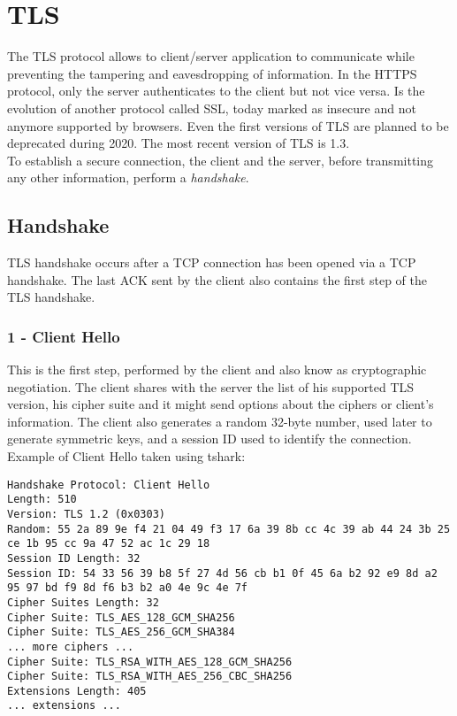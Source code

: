 \section{TLS}
The TLS protocol allows to client/server application to communicate while preventing the tampering and eavesdropping of information. In the HTTPS protocol, only the server authenticates to the client but not vice versa. Is the evolution of another protocol called SSL, today marked as insecure and not anymore supported by browsers. Even the first versions of TLS are planned to be deprecated during 2020. The most recent version of TLS is 1.3.\\
To establish a secure connection, the client and the server, before transmitting any other information, perform a \emph{handshake}.
\subsection{Handshake}
TLS handshake occurs after a TCP connection has been opened via a TCP handshake. The last ACK sent by the client also contains the first step of the TLS handshake.
\subsubsection{1 - Client Hello}
This is the first step, performed by the client and also know as cryptographic negotiation. The client shares with the server the list of his supported TLS version, his cipher suite and it might send options about the ciphers or client's information. The client also generates a random 32-byte number, used later to generate symmetric keys, and a session ID used to identify the connection.\\
Example of Client Hello taken using tshark:
\begin{lstlisting}
Handshake Protocol: Client Hello
Length: 510
Version: TLS 1.2 (0x0303)
Random: 55 2a 89 9e f4 21 04 49 f3 17 6a 39 8b cc 4c 39 ab 44 24 3b 25 ce 1b 95 cc 9a 47 52 ac 1c 29 18
Session ID Length: 32
Session ID: 54 33 56 39 b8 5f 27 4d 56 cb b1 0f 45 6a b2 92 e9 8d a2 95 97 bd f9 8d f6 b3 b2 a0 4e 9c 4e 7f
Cipher Suites Length: 32
Cipher Suite: TLS_AES_128_GCM_SHA256
Cipher Suite: TLS_AES_256_GCM_SHA384
... more ciphers ...
Cipher Suite: TLS_RSA_WITH_AES_128_GCM_SHA256
Cipher Suite: TLS_RSA_WITH_AES_256_CBC_SHA256
Extensions Length: 405
... extensions ...
\end{lstlisting}

